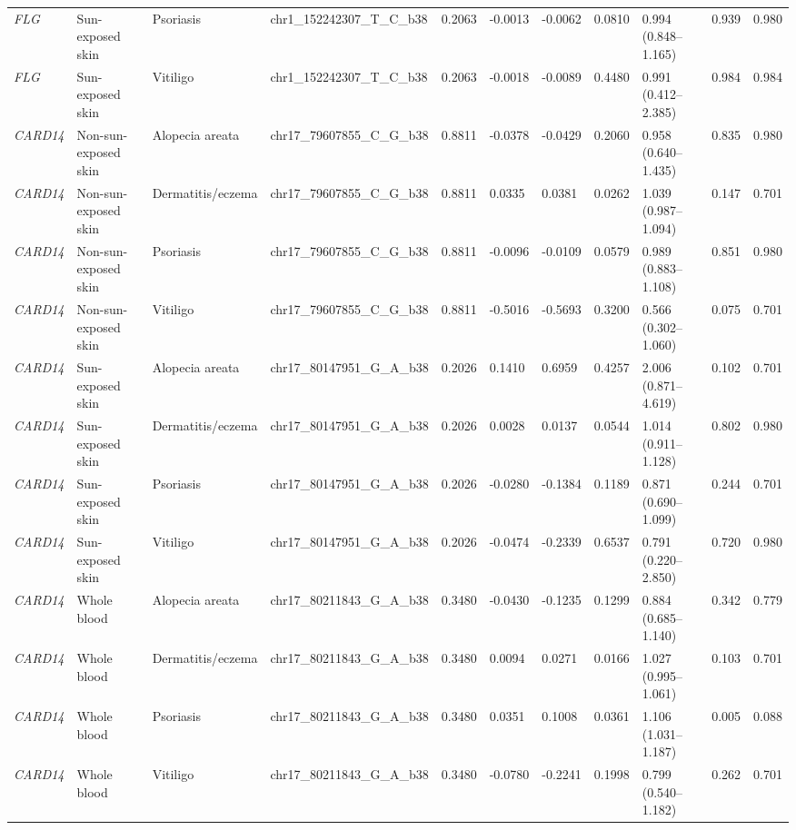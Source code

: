 \documentclass[10pt,a4paper]{article}
\begin{document}
\begin{landscape}
\begin{longtable}{p{1.5cm}p{2.7cm}p{2.5cm}p{4.2cm}p{1.5cm}p{1.5cm}p{1.5cm}p{1.4cm}p{3.4cm}p{1.8cm}p{1.8cm}}
\textit{FLG} & Sun-exposed skin & Psoriasis & chr1\_152242307\_T\_C\_b38 & 0.2063 & -0.0013 & -0.0062 & 0.0810 & 0.994 (0.848--1.165) & 0.939 & 0.980 \\
\textit{FLG} & Sun-exposed skin & Vitiligo & chr1\_152242307\_T\_C\_b38 & 0.2063 & -0.0018 & -0.0089 & 0.4480 & 0.991 (0.412--2.385) & 0.984 & 0.984 \\
\textit{CARD14} & Non-sun-exposed skin & Alopecia areata & chr17\_79607855\_C\_G\_b38 & 0.8811 & -0.0378 & -0.0429 & 0.2060 & 0.958 (0.640--1.435) & 0.835 & 0.980 \\
\textit{CARD14} & Non-sun-exposed skin & Dermatitis/eczema & chr17\_79607855\_C\_G\_b38 & 0.8811 & 0.0335 & 0.0381 & 0.0262 & 1.039 (0.987--1.094) & 0.147 & 0.701 \\
\textit{CARD14} & Non-sun-exposed skin & Psoriasis & chr17\_79607855\_C\_G\_b38 & 0.8811 & -0.0096 & -0.0109 & 0.0579 & 0.989 (0.883--1.108) & 0.851 & 0.980 \\
\textit{CARD14} & Non-sun-exposed skin & Vitiligo & chr17\_79607855\_C\_G\_b38 & 0.8811 & -0.5016 & -0.5693 & 0.3200 & 0.566 (0.302--1.060) & 0.075 & 0.701 \\
\textit{CARD14} & Sun-exposed skin & Alopecia areata & chr17\_80147951\_G\_A\_b38 & 0.2026 & 0.1410 & 0.6959 & 0.4257 & 2.006 (0.871--4.619) & 0.102 & 0.701 \\
\textit{CARD14} & Sun-exposed skin & Dermatitis/eczema & chr17\_80147951\_G\_A\_b38 & 0.2026 & 0.0028 & 0.0137 & 0.0544 & 1.014 (0.911--1.128) & 0.802 & 0.980 \\
\textit{CARD14} & Sun-exposed skin & Psoriasis & chr17\_80147951\_G\_A\_b38 & 0.2026 & -0.0280 & -0.1384 & 0.1189 & 0.871 (0.690--1.099) & 0.244 & 0.701 \\
\textit{CARD14} & Sun-exposed skin & Vitiligo & chr17\_80147951\_G\_A\_b38 & 0.2026 & -0.0474 & -0.2339 & 0.6537 & 0.791 (0.220--2.850) & 0.720 & 0.980 \\
\textit{CARD14} & Whole blood & Alopecia areata & chr17\_80211843\_G\_A\_b38 & 0.3480 & -0.0430 & -0.1235 & 0.1299 & 0.884 (0.685--1.140) & 0.342 & 0.779 \\
\textit{CARD14} & Whole blood & Dermatitis/eczema & chr17\_80211843\_G\_A\_b38 & 0.3480 & 0.0094 & 0.0271 & 0.0166 & 1.027 (0.995--1.061) & 0.103 & 0.701 \\
\textit{CARD14} & Whole blood & Psoriasis & chr17\_80211843\_G\_A\_b38 & 0.3480 & 0.0351 & 0.1008 & 0.0361 & 1.106 (1.031--1.187) & 0.005 & 0.088 \\
\textit{CARD14} & Whole blood & Vitiligo & chr17\_80211843\_G\_A\_b38 & 0.3480 & -0.0780 & -0.2241 & 0.1998 & 0.799 (0.540--1.182) & 0.262 & 0.701 \\
\end{longtable}
\end{landscape}
\end{document}
